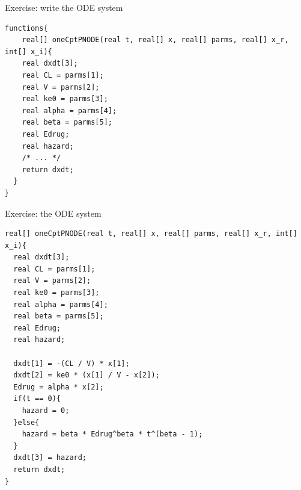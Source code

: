 \documentclass[presentation, allowframebreaks]{beamer}
\begin{document}
\begin{frame}[fragile,label={sec:org1fb5986}]{Exercise: write the ODE system}
 \begin{verbatim}
functions{
    real[] oneCptPNODE(real t, real[] x, real[] parms, real[] x_r, int[] x_i){
    real dxdt[3];
    real CL = parms[1];
    real V = parms[2];
    real ke0 = parms[3];
    real alpha = parms[4];
    real beta = parms[5];
    real Edrug;
    real hazard;
    /* ... */
    return dxdt;
  }
}
\end{verbatim}
\end{frame}

\begin{frame}[fragile,label={sec:orgbef4f37}]{Exercise: the ODE system}
 \begin{verbatim}
real[] oneCptPNODE(real t, real[] x, real[] parms, real[] x_r, int[] x_i){
  real dxdt[3];
  real CL = parms[1];
  real V = parms[2];
  real ke0 = parms[3];
  real alpha = parms[4];
  real beta = parms[5];
  real Edrug;
  real hazard;

  dxdt[1] = -(CL / V) * x[1];
  dxdt[2] = ke0 * (x[1] / V - x[2]);
  Edrug = alpha * x[2];
  if(t == 0){
    hazard = 0;
  }else{
    hazard = beta * Edrug^beta * t^(beta - 1);
  }
  dxdt[3] = hazard;
  return dxdt;
}
\end{verbatim}
\end{frame}
\end{document}
